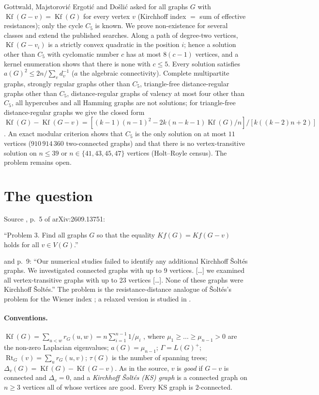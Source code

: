 \documentclass[11pt,a4paper]{report}
\newcommand{\Kf}{\operatorname{Kf}}
\newcommand{\Rt}{\operatorname{Rt}}
\begin{document}
\makepapertitle

\begin{paperabstract}
Gottwald, Majstorovi\'c Ergoti\'c and Do\v{s}li\'c asked for all graphs $G$ with $\Kf(G-v)=\Kf(G)$ for every
vertex $v$ (Kirchhoff index $=$ sum of effective resistances); only the cycle $C_5$ is known. We prove
non-existence for several classes and extend the published searches. Along a path of degree-two vertices,
$\Kf(G-v_i)$ is a strictly convex quadratic in the position $i$; hence a solution other than $C_5$ with
cyclomatic number $c$ has at most $8(c-1)$ vertices, and a kernel enumeration shows that there is none with
$c\le 5$. Every solution satisfies $a(G)^2\le 2n/\sum_v d_v^{-1}$ ($a$ the algebraic connectivity). Complete
multipartite graphs, strongly regular graphs other than $C_5$, triangle-free distance-regular graphs other
than $C_5$, distance-regular graphs of valency at most four other than $C_5$, all hypercubes and all Hamming
graphs are not solutions; for triangle-free distance-regular graphs we give the closed form
$\Kf(G)-\Kf(G-v)=[(k-1)(n-1)^2-2k(n-k-1)\Kf(G)/n]/[k((k-2)n+2)]$. An exact modular criterion shows that $C_5$
is the only solution on at most $11$ vertices ($910\,914\,360$ two-connected graphs) and that there is no
vertex-transitive solution on $n\le39$ or $n\in\{41,43,45,47\}$ vertices (Holt--Royle census). The problem remains open.
\end{paperabstract}

\section*{The question}
Source \autocite{GMD26}, p.~5 of arXiv:2609.13751:
\begin{openquote}
``Problem 3. Find all graphs $G$ so that the equality $Kf(G) = Kf(G - v)$ holds for all $v \in V(G)$.''
\end{openquote}
and p.~9: ``Our numerical studies failed to identify any additional Kirchhoff \v{S}olt\'es graphs. We
investigated connected graphs with up to 9 vertices. [\dots] we examined all vertex-transitive graphs with up to
23 vertices [\dots]. None of these graphs were Kirchhoff \v{S}olt\'es.'' The problem is the resistance-distance
analogue of \v{S}olt\'es's problem for the Wiener index \autocite{Soltes91,KMS18a,KMS18b,BJM21,AOVVVY23,BKS23}; a
relaxed version is studied in \autocite{MEG25}.

\paragraph{Conventions.} $\Kf(G)=\sum_{u<w}r_G(u,w)=n\sum_{i=1}^{n-1}1/\mu_i$ \autocite{KR93,GM96}, where
$\mu_1\ge\dots\ge\mu_{n-1}>0$ are the non-zero Laplacian eigenvalues; $a(G)=\mu_{n-1}$; $\Gamma=L(G)^+$;
$\Rt_G(v)=\sum_u r_G(u,v)$; $\tau(G)$ is the number of spanning trees; $\Delta_v(G)=\Kf(G)-\Kf(G-v)$. As in
the source, $v$ is \emph{good} if $G-v$ is connected and $\Delta_v=0$, and a \emph{Kirchhoff \v{S}olt\'es (KS)
graph} is a connected graph on $n\ge3$ vertices all of whose vertices are good. Every KS graph is
$2$-connected.
\end{document}
